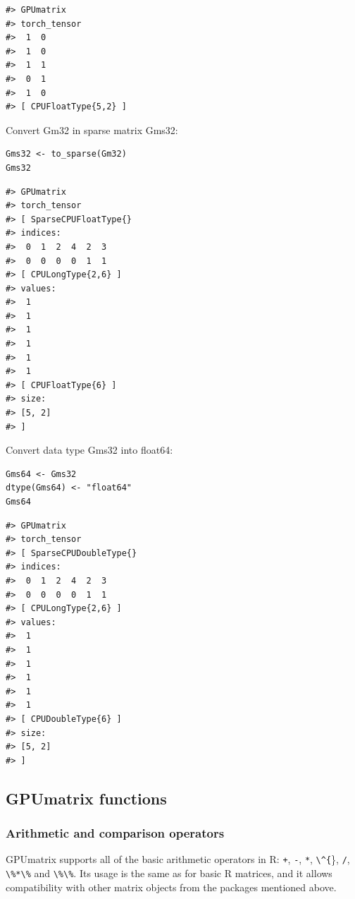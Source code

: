 \begin{verbatim}
#> GPUmatrix
#> torch_tensor
#>  1  0
#>  1  0
#>  1  1
#>  0  1
#>  1  0
#> [ CPUFloatType{5,2} ]
\end{verbatim}

Convert Gm32 in sparse matrix Gms32:

\begin{verbatim}
Gms32 <- to_sparse(Gm32)
Gms32
\end{verbatim}

\begin{verbatim}
#> GPUmatrix
#> torch_tensor
#> [ SparseCPUFloatType{}
#> indices:
#>  0  1  2  4  2  3
#>  0  0  0  0  1  1
#> [ CPULongType{2,6} ]
#> values:
#>  1
#>  1
#>  1
#>  1
#>  1
#>  1
#> [ CPUFloatType{6} ]
#> size:
#> [5, 2]
#> ]
\end{verbatim}

Convert data type Gms32 into float64:

\begin{verbatim}
Gms64 <- Gms32
dtype(Gms64) <- "float64"
Gms64
\end{verbatim}

\begin{verbatim}
#> GPUmatrix
#> torch_tensor
#> [ SparseCPUDoubleType{}
#> indices:
#>  0  1  2  4  2  3
#>  0  0  0  0  1  1
#> [ CPULongType{2,6} ]
#> values:
#>  1
#>  1
#>  1
#>  1
#>  1
#>  1
#> [ CPUDoubleType{6} ]
#> size:
#> [5, 2]
#> ]
\end{verbatim}

\hypertarget{gpumatrix-functions}{%
\subsection{GPUmatrix functions}\label{gpumatrix-functions}}

\hypertarget{arithmetic-and-comparison-operators}{%
\subsubsection{Arithmetic and comparison operators}\label{arithmetic-and-comparison-operators}}

GPUmatrix supports all of the basic arithmetic operators in R: \texttt{+}, \texttt{-}, \texttt{*}, \texttt{\textbackslash{}\^{}\{}\}, \texttt{/}, \texttt{\textbackslash{}\%*\textbackslash{}\%} and \texttt{\textbackslash{}\%\textbackslash{}\%}. Its usage is the same as for basic R matrices, and it allows compatibility with other matrix objects from the packages mentioned above.


